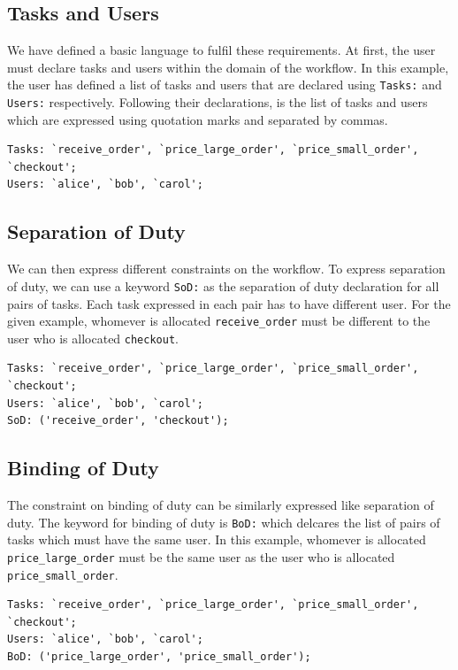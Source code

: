 \documentclass[a4paper]{report}
\begin{document}
\subsection{Tasks and Users}
We have defined a basic language to fulfil these requirements. At first, the user must declare tasks and users within the domain of the workflow. In this example, the user has defined a list of tasks and users that are declared using \texttt{Tasks:} and \texttt{Users:} respectively. Following their declarations, is the list of tasks and users which are expressed using quotation marks and separated by commas. 
\lstset{numbers=none, showspaces=false,
    showstringspaces=false, tabsize=2, breaklines=true,
    xleftmargin=5.0ex,
}
\lstset{basicstyle=\ttfamily}
\begin{lstlisting}[frame=single]
Tasks: `receive_order', `price_large_order', `price_small_order', 
`checkout'; 
Users: `alice', `bob', `carol';
\end{lstlisting}

\subsection{Separation of Duty}
We can then express different constraints on the workflow. To express separation of duty, we can use a keyword \texttt{SoD:} as the separation of duty declaration for all pairs of tasks. Each task expressed in each pair has to have different user. For the given example, whomever is allocated \texttt{receive\_order} must be different to the user who is allocated \texttt{checkout}.
\begin{lstlisting}[frame=single]
Tasks: `receive_order', `price_large_order', `price_small_order', 
`checkout'; 
Users: `alice', `bob', `carol';
SoD: ('receive_order', 'checkout');
\end{lstlisting}

\subsection{Binding of Duty}
The constraint on binding of duty can be similarly expressed like separation of duty. The keyword for binding of duty is \texttt{BoD:} which delcares the list of pairs of tasks which must have the same user. In this example, whomever is allocated \texttt{price\_large\_order} must be the same user as the user who is allocated \texttt{price\_small\_order}.
\begin{lstlisting}[frame=single]
Tasks: `receive_order', `price_large_order', `price_small_order', 
`checkout'; 
Users: `alice', `bob', `carol';
BoD: ('price_large_order', 'price_small_order');
\end{lstlisting}
\end{document}
